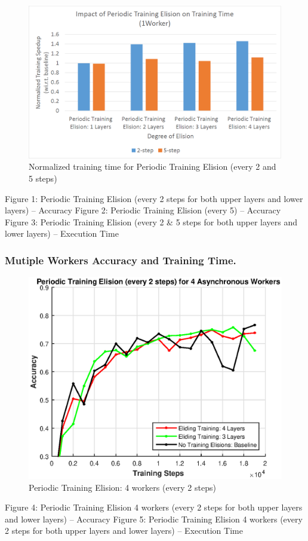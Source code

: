 \begin{figure}[t]
	\centering
	\includegraphics[width=0.8\columnwidth]{figures/fig3.PNG}
	\caption{Normalized training time for Periodic Training Elision (every 2 and 5 steps)}
	\label{fig:fig3}
\end{figure}

Figure 1: Periodic Training Elision (every 2 steps for both upper layers and lower layers) -- Accuracy
Figure 2: Periodic Training Elision (every 5) -- Accuracy
Figure 3: Periodic Training Elision (every 2 \& 5 steps for both upper layers and lower layers) -- Execution Time
\subsubsection{Mutiple Workers Accuracy and Training Time.}
\begin{figure}[t]
	\centering
	\includegraphics[width=0.8\columnwidth]{figures/fig4.eps}
	\caption{Periodic Training Elision: 4 workers (every 2 steps)}
	\label{fig:fig4}
\end{figure}
Figure 4: Periodic Training Elision 4 workers (every 2 steps for both upper layers and lower layers) -- Accuracy
Figure 5: Periodic Training Elision 4 workers (every 2 steps for both upper layers and lower layers) -- Execution Time
